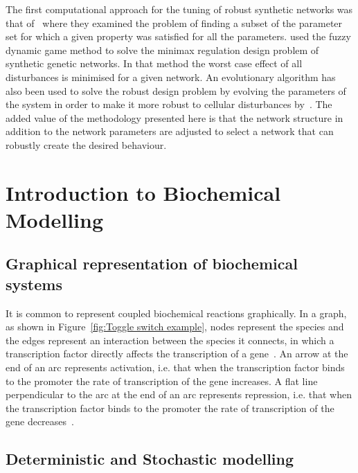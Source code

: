 The first computational approach for the tuning of robust synthetic networks was that of~\textcite{Batt:2007jl} where they examined the problem of finding a subset of the parameter set for which a given property was satisfied for all the parameters. \textcite{Chen:2009ea} used the fuzzy  dynamic game method to solve the minimax regulation design problem of synthetic genetic networks. In that method the worst case effect of all disturbances is minimised for a given network. An evolutionary algorithm has also been used to solve the robust design problem by evolving the parameters of the system in order to make it more robust to cellular disturbances by~\textcite{Chen:2011hj}. The added value of the methodology presented here is that the network structure in addition to the network parameters are adjusted to select a network that can robustly create the desired behaviour.	

\section{Introduction to Biochemical Modelling}
\subsection{Graphical representation of biochemical systems}

It is common to represent coupled biochemical reactions graphically. In a graph, as shown in Figure~\ref{fig:Toggle switch example}, nodes represent the species and the edges represent an interaction between the species it connects, in which a transcription factor directly affects the transcription of a gene~\autocite{alon:2007b}. An arrow at the end of an arc represents activation, i.e. that when the transcription factor binds to the promoter the rate of transcription of the gene increases. A flat line perpendicular to the arc at the end of an arc represents repression, i.e. that when the transcription factor binds to the promoter the rate of transcription of the gene decreases~\autocite{alon:2007b}.

\subsection{Deterministic and Stochastic modelling}

